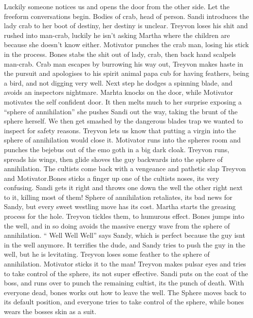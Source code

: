 Luckily someone notices us and opens the door from the other side. Let the freeform conversations begin. Bodies of crab, head of person. Sandi introduces the lady crab to her boot of destiny, her destiny is unclear. Treyvon loses his shit and rushed into man-crab, luckily he isn’t asking Martha where the children are because she doesn’t know either. Motivator punches the crab man, losing his stick in the process. Bones stabs the shit out of lady, crab, then back hand scalpels man-crab.\medskip
Crab man escapes by burrowing his way out, Treyvon makes haste in the pursuit and apologises to his spirit animal papa cub for having feathers, being a bird, and not digging very well. Next step he dodges a spinning blade, and avoids an inspectors nightmare.\medskip
Marhta knocks on the door, while Motivator motivates the self confident door. It then melts much to her surprise exposing a “sphere of annihilation” she pushes Sandi out the way, taking the brunt of the sphere herself. We then get smashed by the dangerous blades trap we wanted to inspect for safety reasons.\medskip
Treyvon lets us know that putting a virgin into the sphere of annihilation would close it.\medskip
Motivator runs into the spheres room and punches the bejebus out of the emo goth in a big dark cloak. Treyvon runs, spreads his wings, then glide shoves the guy backwards into the sphere of annihilation. The cultists come back with a vengeance and pathetic slap Treyvon and Motivator.Bones sticks a finger up one of the cultists noses, its very confusing. Sandi gets it right and throws one down the well the other right next to it, killing most of them! Sphere of annihilation retaliates, its bad news for Sandy, but every sweet westling move has its cost. Martha starts the greasing process for the hole. Treyvon tickles them, to humurous effect. Bones jumps into the well, and in so doing avoids the massive energy wave from the sphere of annihilation. “ Well Well Well” says Sandy, which is perfect because the guy isnt in the well anymore. It terrifies the dude, and Sandy tries to push the guy in the well, but he is levitating. Treyvon loses some feather to the sphere of annihilation. Motivator sticks it to the man!\medskip
Treyvon makes pulsar eyes and tries to take control of the sphere, its not super effective.\medskip
Sandi puts on the coat of the boss, and runs over to punch the remaining cultist, its the punch of death.\medskip
With everyone dead, bones works out how to leave the well. The Sphere moves back to its default position, and everyone tries to take control of the sphere, while bones wears the bosses skin as a suit.\medskip
